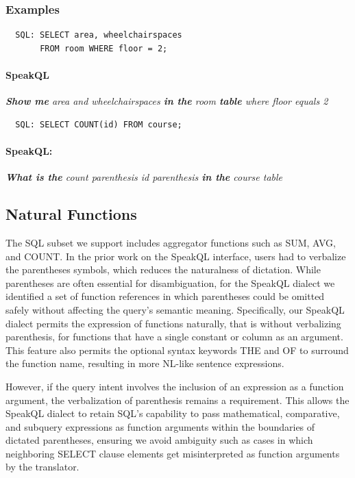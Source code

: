 \subsubsection{\textbf{Examples}}

\begin{verbatim}
  SQL: SELECT area, wheelchairspaces 
       FROM room WHERE floor = 2;
\end{verbatim}
\paragraph{SpeakQL} \emph{\textbf{Show me} area and wheelchairspaces \textbf{in the} room \textbf{table} where floor equals 2}

\vspace{2mm}
\begin{verbatim}
  SQL: SELECT COUNT(id) FROM course;
\end{verbatim}
\paragraph{SpeakQL:} \emph{\textbf{What is the} count parenthesis id parenthesis \textbf{in the} course table}



\subsection{Natural Functions}

The SQL subset we support includes aggregator functions such as SUM, AVG, and COUNT. 
In the prior work on the SpeakQL interface, users had to verbalize the parentheses symbols, which reduces the naturalness of dictation. 
While parentheses are often essential for disambiguation, for the SpeakQL dialect we identified a set of function references in which parentheses could be omitted safely without affecting the query's semantic meaning. 
Specifically, our SpeakQL dialect permits the expression of functions naturally, that is without verbalizing parenthesis, for functions that have a single constant or column as an argument. 
This feature also permits the optional syntax keywords THE and OF to surround the function name, resulting in more NL-like sentence expressions. 

However, if the query intent involves the inclusion of an expression as a function argument, the verbalization of parenthesis remains a requirement. This allows the SpeakQL dialect to retain SQL's capability to pass mathematical, comparative, and subquery expressions as function arguments within the boundaries of dictated parentheses, ensuring we avoid ambiguity such as cases in which neighboring SELECT clause elements get misinterpreted as function arguments by the translator.

